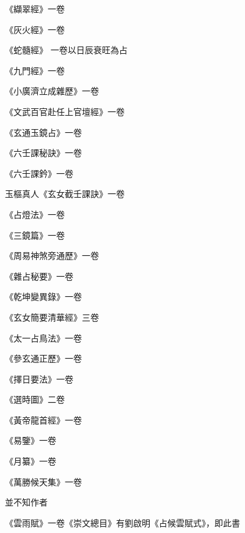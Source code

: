 \begin{pinyinscope}
 《纈翠經》一卷



 《灰火經》一卷



 《蛇髓經》
 一卷以日辰衰旺為占



 《九門經》一卷



 《小廣濟立成雜歷》一卷



 《文武百官赴任上官壇經》一卷



 《玄通玉鏡占》一卷



 《六壬課秘訣》一卷



 《六壬課鈐》一卷



 玉樞真人《玄女截壬課訣》一卷



 《占燈法》一卷



 《三鏡篇》一卷



 《周易神煞旁通歷》一卷



 《雜占秘要》一卷



 《乾坤變異錄》一卷



 《玄女簡要清華經》三卷



 《太一占鳥法》一卷



 《參玄通正歷》一卷



 《擇日要法》一卷



 《選時圖》二卷



 《黃帝龍首經》一卷



 《易鑒》一卷



 《月纂》一卷



 《萬勝候天集》一卷



 並不知作者



 《雲雨賦》一卷《崇文總目》有劉啟明《占候雲賦式》，即此書




\end{pinyinscope}
